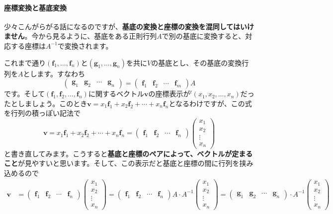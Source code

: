\paragraph{座標変換と基底変換}

少々こんがらがる話になるのですが、\textbf{基底の変換と座標の変換を混同してはいけません}。今から見るように、基底をある正則行列$A$で別の基底に変換すると、対応する座標は$A^{-1}$で変換されます。

これまで通り$(\bm{f}_1, \ldots, \bm{f}_n)$と$(\bm{g}_1, \ldots, \bm{g}_n)$を共に$V$の基底とし、その基底の変換行列を$A$とします。すなわち
\[
\begin{pmatrix}
\bm{g}_1 & \bm{g}_2 & \cdots & \bm{g}_n
\end{pmatrix}
=
\begin{pmatrix}
\bm{f}_1 & \bm{f}_2 & \cdots & \bm{f}_m
\end{pmatrix} A
\]
です。そして$(\bm{f}_1, \bm{f}_2, \ldots, \bm{f}_n)$に関するベクトル$\bm{v}$の座標表示が${}^t(x_1, x_2 ,\ldots, x_n)$だったとしましょう。このとき$\bm{v} = x_1 \bm{f}_1 + x_2 \bm{f}_2 + \cdots + x_n \bm{f}_n$となるわけですが、この式を行列の積っぽい記法で
\[
\bm{v} = x_1 \bm{f}_1 + x_2 \bm{f}_2 + \cdots + x_n \bm{f}_n
=
\begin{pmatrix}
\bm{f}_1 & \bm{f}_2 & \cdots & \bm{f}_n
\end{pmatrix}
\begin{pmatrix}
x_1 \\
x_2 \\
\vdots \\
x_n
\end{pmatrix}
\]
と書き直してみます。こうすると\textbf{基底と座標のペアによって、ベクトルが定まること}が見やすいと思います。そして、この表示だと基底と座標の間に行列を挟み込めるので
\begin{align*}
\bm{v}
&= 
\begin{pmatrix}
\bm{f}_1 & \bm{f}_2 & \cdots & \bm{f}_n
\end{pmatrix}
\begin{pmatrix}
x_1 \\
x_2 \\
\vdots \\
x_n
\end{pmatrix}
=
\begin{pmatrix}
\bm{f}_1 & \bm{f}_2 & \cdots & \bm{f}_n
\end{pmatrix}
A\cdot A^{-1}
\begin{pmatrix}
x_1 \\
x_2 \\
\vdots \\
x_n
\end{pmatrix}
=
\begin{pmatrix}
\bm{g}_1 & \bm{g}_2 & \cdots & \bm{g}_n
\end{pmatrix}
\cdot A^{-1}
\begin{pmatrix}
x_1 \\
x_2 \\
\vdots \\
x_n
\end{pmatrix}
\end{align*}
